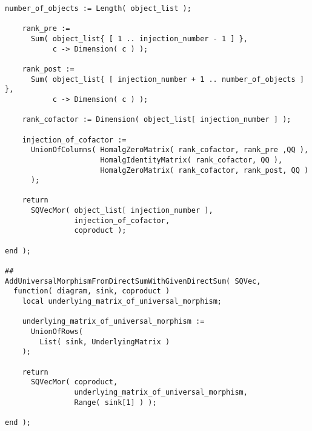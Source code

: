 \begin{small}
\begin{Verbatim}[frame=single]
    number_of_objects := Length( object_list );
    
    rank_pre :=
      Sum( object_list{ [ 1 .. injection_number - 1 ] },
           c -> Dimension( c ) );
    
    rank_post :=
      Sum( object_list{ [ injection_number + 1 .. number_of_objects ] },
           c -> Dimension( c ) );
    
    rank_cofactor := Dimension( object_list[ injection_number ] );
    
    injection_of_cofactor := 
      UnionOfColumns( HomalgZeroMatrix( rank_cofactor, rank_pre ,QQ ),
                      HomalgIdentityMatrix( rank_cofactor, QQ ),
                      HomalgZeroMatrix( rank_cofactor, rank_post, QQ )
      );
    
    return
      SQVecMor( object_list[ injection_number ],
                injection_of_cofactor,
                coproduct );
    
end );

##
AddUniversalMorphismFromDirectSumWithGivenDirectSum( SQVec,
  function( diagram, sink, coproduct )
    local underlying_matrix_of_universal_morphism;
    
    underlying_matrix_of_universal_morphism :=
      UnionOfRows(
        List( sink, UnderlyingMatrix )
    );
    
    return
      SQVecMor( coproduct,
                underlying_matrix_of_universal_morphism,
                Range( sink[1] ) );
    
end );
\end{Verbatim}
\end{small}